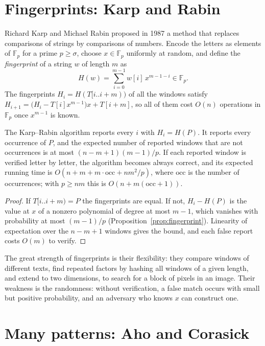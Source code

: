\section{Fingerprints: Karp and Rabin}\label{sec:karprabin}

Richard Karp and Michael Rabin proposed in 1987 a method that replaces comparisons of strings by comparisons of numbers. Encode the letters as elements of $\mathbb F_p$ for a prime $p\ge\sigma$, choose $x\in\mathbb F_p$ uniformly at random, and define the \emph{fingerprint} of a string $w$ of length $m$ as
\[
H(w)=\sum_{i=0}^{m-1}w[i]\,x^{m-1-i}\in\mathbb F_p.
\]
The fingerprints $H_i=H(T[i..i+m))$ of all the windows satisfy $H_{i+1}=\bigl(H_i-T[i]x^{m-1}\bigr)x+T[i+m]$, so all of them cost $O(n)$ operations in $\mathbb F_p$ once $x^{m-1}$ is known.

\begin{theorem}\label{thm:karprabin}
The Karp--Rabin algorithm reports every $i$ with $H_i=H(P)$. It reports every occurrence of $P$, and the expected number of reported windows that are not occurrences is at most $(n-m+1)(m-1)/p$. If each reported window is verified letter by letter, the algorithm becomes always correct, and its expected running time is $O(n+m+m\cdot\mathrm{occ}+nm^2/p)$, where $\mathrm{occ}$ is the number of occurrences; with $p\ge nm$ this is $O(n+m(\mathrm{occ}+1))$.
\end{theorem}
\begin{proof}
If $T[i..i+m)=P$ the fingerprints are equal. If not, $H_i-H(P)$ is the value at $x$ of a nonzero polynomial of degree at most $m-1$, which vanishes with probability at most $(m-1)/p$ (Proposition~\ref{prop:fingerprint}). Linearity of expectation over the $n-m+1$ windows gives the bound, and each false report costs $O(m)$ to verify.
\end{proof}

The great strength of fingerprints is their flexibility: they compare windows of different texts, find repeated factors by hashing all windows of a given length, and extend to two dimensions, to search for a block of pixels in an image. Their weakness is the randomness: without verification, a false match occurs with small but positive probability, and an adversary who knows $x$ can construct one.

\section{Many patterns: Aho and Corasick}\label{sec:aho}

